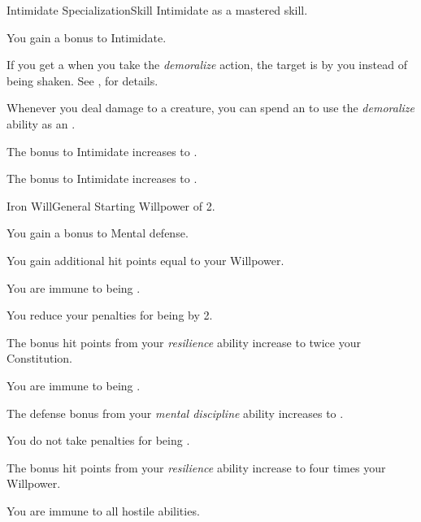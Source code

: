     \begin{feat}{Intimidate Specialization}{Skill}
        \featpre Intimidate as a mastered skill.
        \featben

         You gain a  bonus to Intimidate.

         If you get a  when you take the \textit{demoralize} action, the target is \frightened by you instead of being shaken.
        See , for details.

         Whenever you deal damage to a creature, you can spend an  to use the \textit{demoralize} ability as an .

         The bonus to Intimidate increases to .

         The bonus to Intimidate increases to .
    \end{feat}

    \begin{feat}{Iron Will}{General}
        \featpre Starting Willpower of 2.
        \featben

         You gain a  bonus to Mental defense.

         You gain additional hit points equal to your Willpower.

         You are immune to being .

         You reduce your penalties for being  by 2.

         The bonus hit points from your \textit{resilience} ability increase to twice your Constitution.

         You are immune to being .

         The defense bonus from your \textit{mental discipline} ability increases to .

         You do not take penalties for being .

         The bonus hit points from your \textit{resilience} ability increase to four times your Willpower.

         You are immune to all hostile  abilities.
    \end{feat}


